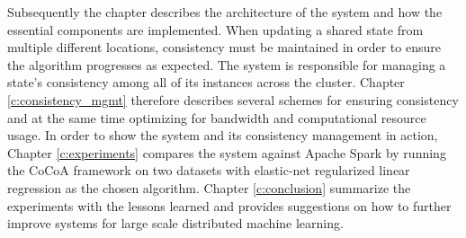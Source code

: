 Subsequently the chapter describes the architecture of the system and how the essential components are implemented.
When updating a shared state from multiple different locations, consistency must be maintained in order to ensure the algorithm progresses as expected. The system is responsible for managing a state's consistency among all of its instances across the cluster. Chapter \ref{c:consistency_mgmt} therefore describes several schemes for ensuring consistency and at the same time optimizing for bandwidth and computational resource usage.
In order to show the system and its consistency management in action, Chapter \ref{c:experiments} compares the system against Apache Spark by running the CoCoA framework on two datasets with elastic-net regularized linear regression as the chosen algorithm.
Chapter \ref{c:conclusion} summarize the experiments with the lessons learned and provides suggestions on how to further improve systems for large scale distributed machine learning.
